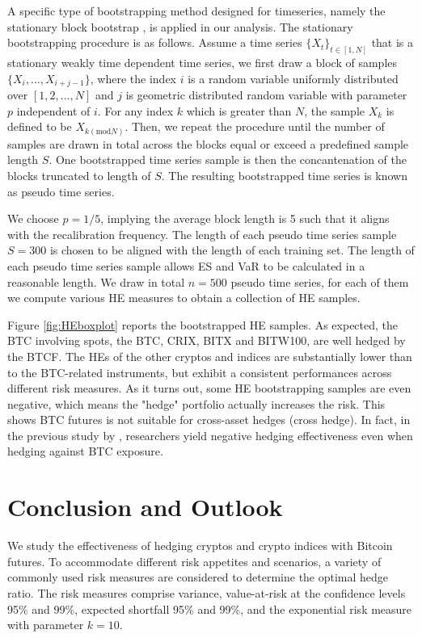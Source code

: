 \documentclass[11pt,a4paper,english]{article}
\begin{document}
A specific type of bootstrapping method designed for timeseries, namely the stationary block bootstrap \cite{Politis1994}, is applied in our analysis.
The stationary bootstrapping procedure is as follows. 
Assume a time series $\{X_t\}_{t \in [1,N]}$ that is
a stationary weakly time dependent time series,
 we first draw a block of samples $\{X_i, ..., X_{i+j-1}\}$, where the index $i$ is a
random variable uniformly distributed over 
$[1,2,...,N]$ and $j$ is geometric distributed random variable with
parameter $p$ independent of $i$. 
For any index $k$ which is greater than $N$, the sample $X_k$ is
defined to be $X_{k(\mathrm{mod} N)}$. 
Then, we repeat the procedure until the number of samples are drawn in total across the blocks equal or exceed a predefined sample length $S$. 
One bootstrapped time series sample is then the concantenation of the blocks truncated to length of $S$.
The resulting bootstrapped time series is known as pseudo time series. 

We choose $p=1/5$, implying the average block length is 5 such that it aligns with the recalibration frequency. 
The length of each pseudo time series sample $S = 300$ is chosen to be aligned with the length of each training set.  
The length of each pseudo time series sample allows ES and VaR to be calculated in a reasonable length.
We draw in total $n=500$ pseudo time series,
for each of them we compute various HE measures to obtain a collection of HE samples. 

Figure \ref{fig:HEboxplot} reports the bootstrapped HE samples.
As expected, the BTC involving spots, the BTC, CRIX, BITX and BITW100, are well hedged
by the BTCF. 
The HEs of the other cryptos and indices are
substantially lower than to the BTC-related instruments, but 
exhibit a consistent performances across different risk measures. 
As it turns out, some HE bootstrapping samples are even negative,
which means the "hedge" portfolio actually increases the risk. 
This shows BTC futures is not suitable for cross-asset hedges (cross hedge).
In fact, in the previous study by \citet{corbet2018bitcoin}, 
researchers yield negative hedging effectiveness even when hedging against BTC exposure.



\section{Conclusion and Outlook}\label{sec:conclusion-and-outlook}
We study the effectiveness of hedging cryptos and crypto indices with
Bitcoin futures.
To accommodate different risk appetites and scenarios, a variety of
commonly used risk measures are considered to determine the optimal
hedge ratio. The risk measures comprise variance, value-at-risk at
the confidence levels 95\% and 99\%, expected shortfall 95\% and 99\%,
and the exponential risk measure with parameter $k=10$.
\end{document}
